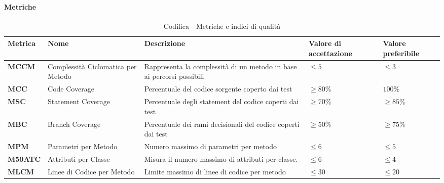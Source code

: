 \paragraph{Metriche} 
\hspace{1pt}
\begin{table}[H]
    \centering
    \begin{tabular}{|C{1.5cm}|L{3cm}|L{4cm}|L{2.5cm}|L{2.5cm}|}
        \hline
        \textbf{Metrica} & \textbf{Nome} & \textbf{Descrizione} & \textbf{Valore di accettazione} & \textbf{Valore preferibile} \\
        \hline
        \textbf{MCCM} & Complessità Ciclomatica per Metodo & Rappresenta la complessità di un metodo in base ai percorsi possibili & $\leq 5$ & $\leq 3$ \\
        \hline
        \textbf{MCC} & Code Coverage & Percentuale del codice sorgente coperto dai test & $\geq 80\%$ & $100\%$ \\
        \hline
        \textbf{MSC} & Statement Coverage & Percentuale degli statement del codice coperti dai test & $\geq 70\%$ & $\geq 85\%$ \\
        \hline
        \textbf{MBC} & Branch Coverage & Percentuale dei rami decisionali del codice coperti dai test & $\geq 50\%$ & $\geq 75\%$ \\
        \hline
        \textbf{MPM} & Parametri per Metodo & Numero massimo di parametri per metodo & $\leq 6$ & $\leq 5$ \\
        \hline
        \textbf{M50ATC} & Attributi per Classe & Misura il numero massimo di attributi per classe. & $\leq 6$ & $\leq 4$ \\
        \hline
         \textbf{MLCM} & Linee di Codice per Metodo & Limite massimo di linee di codice per metodo & $\leq 30$ & $\leq 20$ \\
        \hline
    \end{tabular}
    \caption{Codifica - Metriche e indici di qualità}
    \label{tab:metriche}
\end{table}